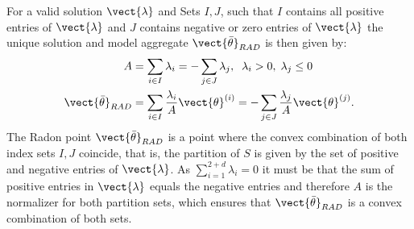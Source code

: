 For a valid solution $\vect{\lambda}$ and Sets $I,J$, such that $I$ contains all positive entries of $\vect{\lambda}$ and $J$ contains negative or zero entries of $\vect{\lambda}$ the unique solution and model aggregate $\vect{\bar{\theta}}_{RAD}$ is then given by:
\begin{equation}
    \label{eq:radonpoint}
    \begin{split}
    A &= \sum_{i\in I} \lambda_i = - \sum_{j\in J} \lambda_j, \; \;\lambda_i > 0, \; \lambda_j \leq 0 \\
    \vect{\bar{\theta}}_{RAD} &= \sum_{i\in I} \frac{\lambda_i}{A} \vect{\theta}^{(i)} = - \sum_{j\in J} \frac{\lambda_j}{A} \vect{\theta}^{(j)}.
    \end{split}
\end{equation}
The Radon point $\vect{\bar{\theta}}_{RAD}$ is a point where the convex combination of both index sets $I, J$ coincide, that is, the partition of $S$ is given by the set of positive and negative entries of $\vect{\lambda}$.
As $\sum_{i=1}^{2+d} \lambda_i = 0$ it must be that the sum of positive entries in $\vect{\lambda}$ equals the negative entries and therefore $A$ is the normalizer for both partition sets, which ensures that $\vect{\bar{\theta}}_{RAD}$ is a convex combination of both sets.

